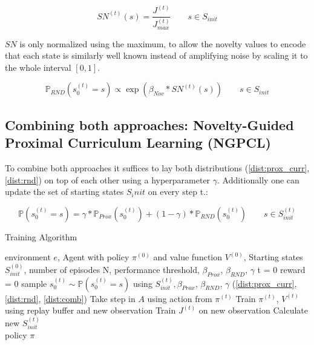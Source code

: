 \documentclass{article}
\begin{document}
\[ SN^{(t)}(s) = \frac{J^{(t)}}{J_{max}^{(t)}} \qquad s \in S_{init} \]

$SN$ is only normalized using the maximum, to allow the novelty values to encode that each state is similarly well known instead of amplifying noise by scaling it to the whole interval $[0, 1]$.

\begin{equation}\label{dist:rnd}
  \mathbb{P}_{RND}(s_0^{(t)} = s) \propto \exp(\beta_{Nov} * SN^{(t)}(s)) \qquad s \in S_{init}
\end{equation}

\subsection{Combining both approaches: Novelty-Guided Proximal Curriculum Learning (NGPCL)}
\label{sec:comb}

To combine both approaches it suffices to lay both distributions (\cref{dist:prox_curr}, \cref{dist:rnd}) on top of each other using a hyperparameter $\gamma$. Additionally one can update the set of starting states $S_init$ on every step t.:

\begin{equation}\label{dist:comb}
  \mathbb{P}(s_0^{(t)} = s) = \gamma * \mathbb{P}_{Prox}(s_0^{(t)}) + (1 - \gamma) * \mathbb{P}_{RND}(s_0^{(t)}) \qquad s \in S_{init}^{(t)}
\end{equation}

\begin{algorithm}[H]
    \caption{Training Algorithm}
    \label{alg:code}
    \begin{algorithmic}
      \Require environment $e$, Agent with policy $\pi^{(0)}$ and value function $V^{(0)}$, Starting states $S_{init}^{(0)}$, number of episodes N, performance threshold, $\beta_{Prox}$, $\beta_{RND}$, $\gamma$ \eta
        \State t = 0
        \State reward = 0
        \State sample $s_0^{(t)} \sim \mathbb{P}(s_0^{(t)} = s)$ using $S_{init}^{(t)}, \beta_{Prox}$, $\beta_{RND}$, $\gamma$ (\cref{dist:prox_curr}, \cref{dist:rnd}, \cref{dist:comb})
          \State Take step in $A$ using action from $\pi^{(t)}$
          \State Train $\pi^{(t)}$, $V^{(t)}$ using replay buffer and new observation
          \State Train $J^{(t)}$ on new observation
          \State Calculate new $S_{init}^{(t)}$
        \EndWhile \\
        \Return policy $\pi$
    \end{algorithmic}
\end{algorithm}
\end{document}
